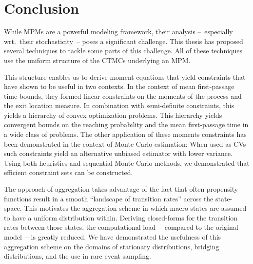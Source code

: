 \chapter{Conclusion}
While \acfp{MPM} are a powerful modeling framework, their analysis --~especially wrt.\ their stochasticity~-- poses a significant challenge.
This thesis has proposed several techniques to tackle some parts of this challenge.
All of these techniques use the uniform structure of the \acp{CTMC} underlying an \ac{MPM}.

This structure enables us to derive moment equations that yield constraints that have shown to be useful in two contexts.
In the context of mean first-passage time bounds, they formed linear constraints on the moments of the process and the exit location measure.
In combination with semi-definite constraints, this yields a hierarchy of convex optimization problems.
This hierarchy yields convergent bounds on the reaching probability and the mean first-passage time in a wide class of problems.
The other application of these moments constraints has been demonstrated in the context of Monte Carlo estimation:
When used as \acfp{CV} such constraints yield an alternative unbiased estimator with lower variance.
Using both heuristics and sequential Monte Carlo methods, we demonstrated that efficient constraint sets can be constructed.

The approach of aggregation takes advantage of the fact that often propensity functions result in a smooth ``landscape of transition rates'' across the state-space.
This motivates the aggregation scheme in which macro states are assumed to have a uniform distribution within.
Deriving closed-forms for the transition rates between those states, the computational load --~compared to the original model~-- is greatly reduced.
We have demonstrated the usefulness of this aggregation scheme on the domains of stationary distributions, bridging distributions, and the use in rare event sampling.


